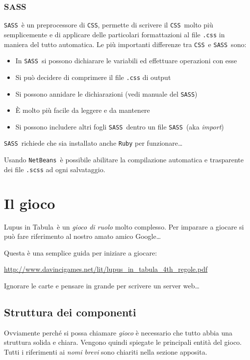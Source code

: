 \documentclass[10pt,a4paper]{article}
\newcommand{\lang}[1]{\texttt{#1}}
\newcommand{\SASS}{\lang{SASS}}
\newcommand{\CSS}{\lang{CSS}}
\newcommand{\pack}[1]{\texttt{#1}}
\newcommand{\NetBeans}{\pack{NetBeans}}
\newcommand{\lupus}{Lupus in Tabula}
\begin{document}
\subsubsection*{SASS}
\SASS\ è un preprocessore di \CSS, permette di scrivere il \CSS\ molto più semplicemente e di applicare delle particolari formattazioni al file \texttt{.css} in maniera del tutto automatica. Le più importanti differenze tra \CSS\ e \SASS\ sono:
\begin{itemize}
\item In \SASS\ si possono dichiarare le variabili ed effettuare operazioni con esse
\item Si può decidere di comprimere il file \texttt{.css} di output 
\item Si possono annidare le dichiarazioni (vedi manuale del \SASS)
\item È molto più facile da leggere e da mantenere
\item Si possono includere altri fogli \SASS\ dentro un file \SASS\ (aka \emph{import})
\end{itemize}

\SASS\ richiede che sia installato anche \lang{Ruby} per funzionare\dots 

Usando \NetBeans\ è possibile abilitare la compilazione automatica e trasparente dei file \texttt{.scss} ad ogni salvataggio.

\newpage

\section{Il gioco}
\lupus\ è un \emph{gioco di ruolo} molto complesso. Per imparare a giocare si può fare riferimento al nostro amato amico Google\dots

Questa è una semplice guida per iniziare a giocare:

\url{http://www.davincigames.net/lit/lupus_in_tabula_4th_regole.pdf}

Ignorare le carte e pensare in grande per scrivere un server web\dots

\subsection{Struttura dei componenti}
Ovviamente perché si possa chiamare \emph{gioco} è necessario che tutto abbia una struttura solida e chiara. Vengono quindi spiegate le principali entità del gioco. Tutti i riferimenti ai \emph{nomi brevi} sono chiariti nella sezione apposita.
\end{document}
